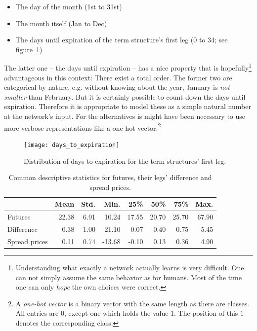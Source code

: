 \newpage

\begin{itemize}
	\item The day of the month (1st to 31st)
	\item The month itself (Jan to Dec)
	\item The days until expiration of the term structure's first leg (0 to 34; see figure~\ref{fig:daystoexpiration})
\end{itemize}

The latter one -- the days until expiration -- has a nice property that is hopefully\footnote{%
Understanding what exactly a network actually learns is very difficult. One can not simply assume the same behavior as for humans. Most of the time one can only \emph{hope} the own choices were correct.}
advantageous in this context: 
There exist a total order. The former two are categorical by nature, e.g. without knowing about the year, January is \emph{not smaller} than February. But it is certainly possible to count down the days until expiration. Therefore it is appropriate to model these as a simple natural number at the network's input. For the alternatives is might have been necessary to use more verbose representations like a one-hot vector.\footnote{%
	A \emph{one-hot vector} is a binary vector with the same length as there are classes. All entries are $0$, except one which holds the value $1$. The position of this $1$ denotes the corresponding class.}

\begin{figure}
	\centering
	\texttt{[image: days\_to\_expiration]}
	\caption[Distribution of days to expiration for the termstructures' first leg]{%
		Distribution of days to expiration for the term structures' first leg.}
	\label{fig:daystoexpiration}
\end{figure}

\begin{table}
	\centering
	\caption[Descriptive statistics for futures and spread prices]{Common descriptive statistics for futures, their legs' difference and spread prices.}
	\begin{tabular}{lrrrrrrr}
		\toprule
		{} &  Mean &  Std. &    Min. &   25\% &   50\% &   75\% &  Max. \\
		\midrule
		Futures & 22.38 & 6.91 &  10.24 & 17.55 & 20.70 & 25.70 & 67.90 \\
		Difference & 0.38 & 1.00 & 21.10 & 0.07 & 0.40 & 0.75 & 5.45 \\
		Spread prices  &  0.11 & 0.74 & -13.68 & -0.10 &  0.13 &  0.36 &  4.90 \\
		\bottomrule
	\end{tabular}
	\label{tab:descriptive-stats}
\end{table}

